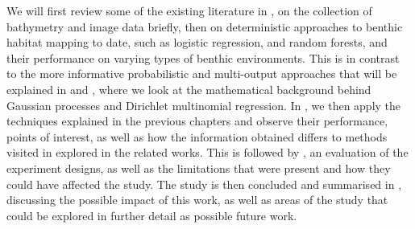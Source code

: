 We will first review some of the existing literature in , on the collection of bathymetry and image data briefly, then on deterministic approaches to benthic habitat mapping to date, such as logistic regression, and random forests, and their performance on varying types of benthic environments. This is in contrast to the more informative probabilistic and multi-output approaches that will be explained in  and , where we look at the mathematical background behind Gaussian processes and Dirichlet multinomial regression. In , we then apply the techniques explained in the previous chapters and observe their performance, points of interest, as well as how the information obtained differs to methods visited in explored in the related works. This is followed by , an evaluation of the experiment designs, as well as the limitations that were present and how they could have affected the study. The study is then concluded and summarised in , discussing the possible impact of this work, as well as areas of the study that could be explored in further detail as possible future work.

